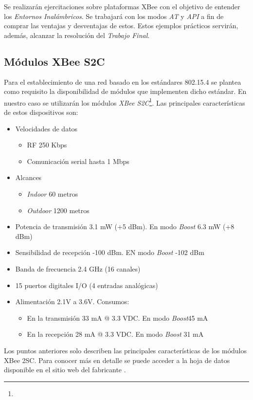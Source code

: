 \documentclass[11pt,oneside,spanish,a4paper]{article}
\begin{document}
Se realizarán ejercitaciones sobre plataformas XBee con el objetivo
de entender los \emph{Entornos Inalámbricos}. Se trabajará con los
modos \emph{AT} y \emph{API} a fin de comprar las ventajas y
desventajas de estos. Estos ejemplos prácticos servirán, además,
alcanzar la resolución del \emph{Trabajo Final}.

\subsection{Módulos XBee S2C}
\label{sec:xbee-mod}

Para el establecimiento de una red basado en los estándares 802.15.4
se plantea como requisito la disponibilidad de módulos que implementen
dicho estándar. En nuestro caso se utilizarán los módulos \emph{XBee
  S2C}\footnote{}. Las
principales características de estos dispositivos son:
\begin{itemize}
\item Velocidades de datos
  \begin{itemize}
  \item RF 250 Kbps
  \item Comunicación serial hasta 1 Mbps
  \end{itemize}
\item Alcances
  \begin{itemize}
  \item \textsl{Indoor} 60 metros
  \item \textsl{Outdoor} 1200 metros
  \end{itemize}
\item Potencia de transmisión 3.1 mW (+5 dBm). En modo \textsl{Boost}
  6.3 mW (+8 dBm)
\item Sensibilidad de recepción -100 dBm. EN modo \textsl{Boost} -102
  dBm
\item Banda de frecuencia 2.4 GHz (16 canales)
\item 15 puertos digitales I/O (4 entradas analógicas)
\item Alimentación 2.1V a 3.6V. Consumos:
  \begin{itemize}
  \item En la transmisión 33 mA @ 3.3 VDC. En modo \textsl{Boost}45 mA
  \item En la recepción 28 mA @ 3.3 VDC. En modo \textsl{Boost} 31 mA
  \end{itemize}
\end{itemize}

Los puntos anteriores solo describen las principales características
de los módulos XBee 2SC. Para conocer más en detalle se puede acceder
a la hoja de datos disponible en el sitio web del fabricante
\cite{s2c-ds}.
\end{document}
